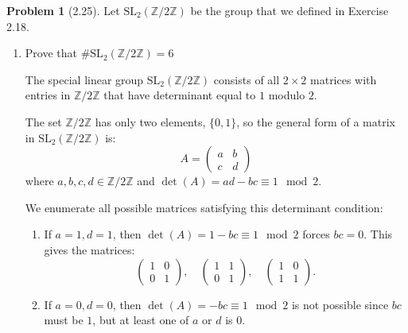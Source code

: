 \documentclass[12pt]{article}
\theoremstyle{definition}
\newtheorem{problem}{Problem}
\begin{document}
\begin{problem}[2.25]
    Let $\text{SL}_2(\mathbb{Z}/2\mathbb{Z})$ be the group that we defined in Exercise 2.18.
    \begin{enumerate}[label=(\alph*)]
        \item Prove that $\#\text{SL}_2(\mathbb{Z}/2\mathbb{Z}) = 6$
        
        \begin{solution}
            The special linear group $\text{SL}_2(\mathbb{Z}/2\mathbb{Z})$ consists of all $2 \times 2$ matrices with entries in $\mathbb{Z}/2\mathbb{Z}$ that have determinant equal to $1$ modulo $2$.

            The set $\mathbb{Z}/2\mathbb{Z}$ has only two elements, $\{0,1\}$, so the general form of a matrix in $\text{SL}_2(\mathbb{Z}/2\mathbb{Z})$ is:
            \[
            A = \begin{pmatrix} a & b \\ c & d \end{pmatrix}
            \]
            where $a, b, c, d \in \mathbb{Z}/2\mathbb{Z}$ and $\det(A) = ad - bc \equiv 1 \mod 2$.
    
            We enumerate all possible matrices satisfying this determinant condition:
            
            \begin{enumerate}[label=(\roman*)]
            \item If $a = 1, d = 1$, then $\det(A) = 1 - bc \equiv 1 \mod 2$ forces $bc = 0$. This gives the matrices:
              \[
              \begin{pmatrix} 1 & 0 \\ 0 & 1 \end{pmatrix}, \quad
              \begin{pmatrix} 1 & 1 \\ 0 & 1 \end{pmatrix}, \quad
              \begin{pmatrix} 1 & 0 \\ 1 & 1 \end{pmatrix}.
              \]
    
            \item If $a = 0, d = 0$, then $\det(A) = -bc \equiv 1 \mod 2$ is not possible since $bc$ must be $1$, but at least one of $a$ or $d$ is $0$.
    

\end{enumerate}
\end{solution}
\end{enumerate}
\end{problem}
\end{document}

